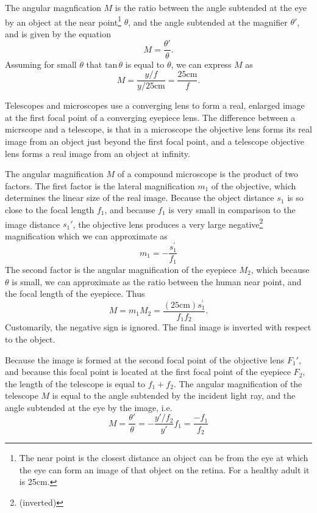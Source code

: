 \documentclass[nobib,notoc]{tufte-handout}
\begin{document}
\begin{defi}
	The angular magnfication \(M\) is the ratio between the angle subtended at the eye by an object at the near point\footnote{The near point is the closest distance an object can be from the eye at which the eye can form an image of that object on the retina. For a healthy adult it is 25cm.} \(\theta\), and the angle subtended at the magnifier \(\theta'\), and is given by the equation
	\begin{equation*}
		M=\frac{\theta'}{\theta}.
	\end{equation*}
	Assuming for small \(\theta\) that \(\text{tan}\,\theta\) is equal to \(\theta\), we can express \(M\) as
	\begin{equation*}
		M=\frac{y/f}{y/25\text{cm}}=\frac{25\text{cm}}{f}.
	\end{equation*}
\end{defi}
\begin{rema}
	Telescopes and microscopes use a converging lens to form a real, enlarged image at the first focal point of a converging eyepiece lens. The difference between a micrscope and a telescope, is that in a microscope the objective lens forms its real image from an object just beyond the first focal point, and a telescope objective lens forms a real image from an object at infinity.
\end{rema}
\begin{defi}
	The angular magnification \(M\) of a compound microscope is the product of two factors. The first factor is the lateral magnification \(m_1\) of the objective, which determines the linear size of the real image. Because the object distance \(s_1\) is so close to the focal length \(f_1\), and because \(f_1\) is very small in comparison to the image distance \(s_1'\), the objective lens produces a very large negative\footnote{(inverted)} magnification which we can approximate as
	\begin{equation*}
		m_1=-\frac{s_{1}^{'}}{f_1}
	\end{equation*}
	The second factor is the angular magnification of the eyepiece \(M_2\), which because \(\theta\) is small, we can approximate as the ratio between the human near point, and the focal length of the eyepiece. Thus
	\begin{equation*}
		M=m_1M_2=\frac{(25\text{cm})s_{1}^{'}}{f_1f_2}.
	\end{equation*}
	Customarily, the negative sign is ignored. The final image is inverted with respect to the object.
\end{defi}
\begin{defi}
	Because the image is formed at the second focal point of the objective lens \(F_1'\), and because this focal point is located at the first focal point of the eyepiece \(F_2\), the length of the telescope is equal to \(f_1+f_2\). The angular magnification of the telescope \(M\) is equal to the angle subtended by the incident light ray, and the angle subtended at the eye by the image, i.e.
	\begin{equation*}
		M=\frac{\theta'}{\theta}=-\frac{y'/f_2}{y'}{f_1}=\frac{-f_1}{f_2}
	\end{equation*}
\end{defi}
\end{document}
